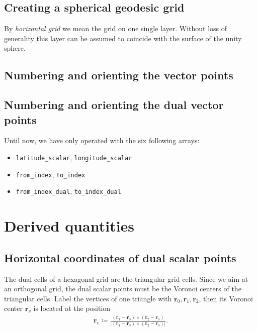 \documentclass[10pt]{report}
\begin{document}
\subsection{Creating a spherical geodesic grid}
\label{sec:creating_a_spherical_geodesic_grid}

By \textit{horizontal grid} we mean the grid on one single layer. Without loss of generality this layer can be assumed to coincide with the surface of the unity sphere.

\subsection{Numbering and orienting the vector points}
\label{sec:numbering_and_orienting_the_vector_points}

\subsection{Numbering and orienting the dual vector points}
\label{sec:numbering_and_orienting_the_dual_vector_points}

Until now, we have only operated with the six following arrays:
%
\begin{itemize}
\item \texttt{latitude\_scalar}, \texttt{longitude\_scalar}
\item \texttt{from\_index}, \texttt{to\_index}
\item \texttt{from\_index\_dual}, \texttt{to\_index\_dual}
\end{itemize}
%

\section{Derived quantities}
\label{sec:derived_quantities}

\subsection{Horizontal coordinates of dual scalar points}
\label{sec:horizontal_coordinates_of_dual_scalar_points}

The dual cells of a hexagonal grid are the triangular grid cells. Since we aim at an orthogonal grid, the dual scalar points must be the Voronoi centers of the triangular cells. Label the vertices of one triangle with $\mathbf{r}_0, \mathbf{r}_1, \mathbf{r}_2$, then its Voronoi center $\mathbf{r}_v$ is located at the position
%
\begin{align}
\mathbf{r}_v \coloneqq \frac{\left(\mathbf{r}_1 - \mathbf{r}_0\right)\times\left(\mathbf{r}_2 - \mathbf{r}_0\right)}{\left|\left(\mathbf{r}_1 - \mathbf{r}_0\right)\times\left(\mathbf{r}_2 - \mathbf{r}_0\right)\right|}.
\end{align}
\end{document}

